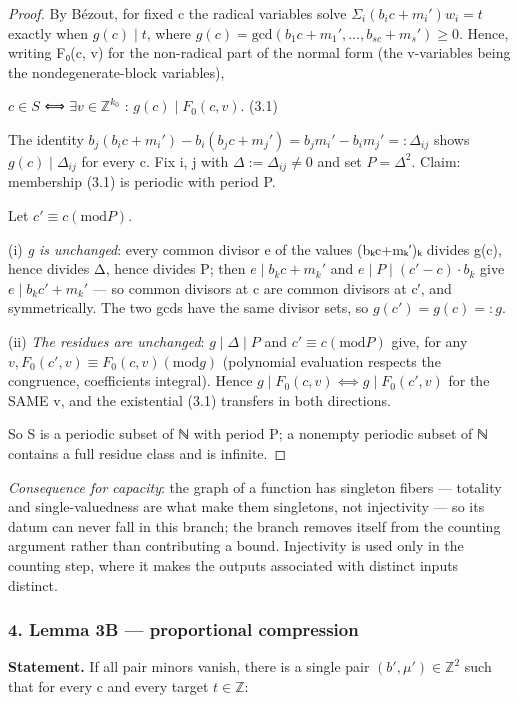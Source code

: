 \documentclass[11pt]{article}
\theoremstyle{plain}
\theoremstyle{definition}
\theoremstyle{remark}
\theoremstyle{plain}
\theoremstyle{definition}
\theoremstyle{remark}
\theoremstyle{plain}
\theoremstyle{definition}
\theoremstyle{remark}
\begin{document}
\begin{proof}
By Bézout, for fixed c the radical variables solve $Σ_{i} (b_{i}c+m_{i}′)w_{i} = t$ exactly when $g(c) ∣ t$, where $g(c) = \mathrm{gcd}(b_{1}c+m_{1}′, …, b_{sc}+m_{s}′) ≥ 0$. Hence, writing F₀(c, v) for the non-radical part of the normal form (the v-variables being the nondegenerate-block variables),

$c ∈ S$  ⟺  $∃ v ∈ ℤ^{k_{0}}$ : $g(c) ∣ F_{0}(c, v)$.                    (3.1)

The identity  $b_{j}(b_{i}c + m_{i}′) − b_{i}(b_{j}c + m_{j}′) = b_{j}m_{i}′ − b_{i}m_{j}′ =: Δ_{ij}$ shows $g(c) ∣ Δ_{ij}$ for every c. Fix i, j with $Δ := Δ_{ij} ≠ 0$ and set $P = Δ^{2}$. Claim: membership (3.1) is periodic with period P.

Let $c′ ≡ c (\mathrm{mod} P)$.

(i) \emph{g is unchanged}: every common divisor e of the values (bₖc+mₖ′)ₖ divides g(c), hence divides Δ, hence divides P; then $e ∣ b_{k}c+m_{k}′$ and $e ∣ P ∣ (c′−c)·b_{k}$ give $e ∣ b_{k}c′+m_{k}′$ — so common divisors at c are common divisors at c′, and symmetrically. The two gcds have the same divisor sets, so $g(c′) = g(c) =: g$.

(ii) \emph{The residues are unchanged}: $g ∣ Δ ∣ P$ and $c′ ≡ c (\mathrm{mod} P)$ give, for any $v, F_{0}(c′, v) ≡ F_{0}(c, v) (\mathrm{mod} g)$ (polynomial evaluation respects the congruence, coefficients integral). Hence $g ∣ F_{0}(c, v) ⟺ g ∣ F_{0}(c′, v)$ for the SAME v, and the existential (3.1) transfers in both directions.

So S is a periodic subset of ℕ with period P; a nonempty periodic subset of ℕ contains a full residue class and is infinite.

\end{proof}
\emph{Consequence for capacity}: the graph of a function has singleton fibers — totality and single-valuedness are what make them singletons, not injectivity — so its datum can never fall in this branch; the branch removes itself from the counting argument rather than contributing a bound. Injectivity is used only in the counting step, where it makes the outputs associated with distinct inputs distinct.

\subsubsection*{4. Lemma 3B — proportional compression}
\textbf{Statement.} If all pair minors vanish, there is a single pair $(b′, μ′) ∈ ℤ^{2}$ such that for every c and every target $t ∈ ℤ$:
\end{document}
